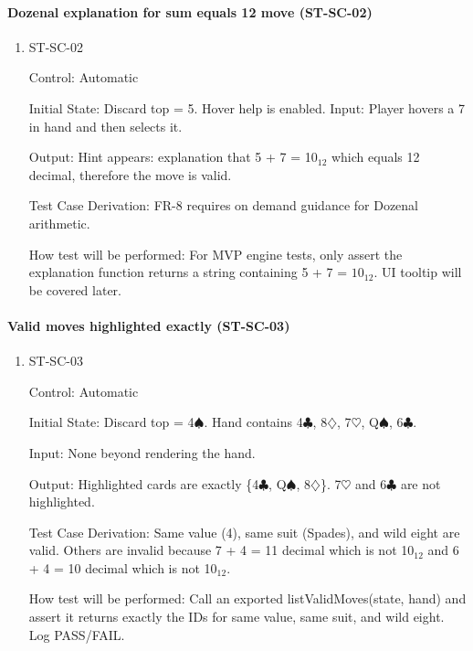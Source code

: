 \documentclass[12pt, titlepage]{article}
\begin{document}
\paragraph{Dozenal explanation for sum equals 12 move (ST-SC-02)}

\begin{enumerate}
\item{ST-SC-02\\}

Control: Automatic
					
Initial State: Discard top = 5. Hover help is enabled.					
Input: Player hovers a 7 in hand and then selects it.
					
Output: Hint appears: explanation that 5 + 7 = 10$_{12}$ which equals 12 decimal, therefore the move is valid.

Test Case Derivation: FR-8 requires on demand guidance for Dozenal arithmetic.

How test will be performed: For MVP engine tests, only assert the explanation function returns a string containing 5 + 7 = $10_{12}$. UI tooltip will be covered later.
\end{enumerate}

\paragraph{Valid moves highlighted exactly (ST-SC-03)}

\begin{enumerate}
\item{ST-SC-03\\}

Control: Automatic
					
Initial State: Discard top = 4$\spadesuit$. Hand contains 4$\clubsuit$, 8$\diamondsuit$, 7$\heartsuit$, Q$\spadesuit$, 6$\clubsuit$.
					
Input: None beyond rendering the hand.
					
Output: Highlighted cards are exactly \{4$\clubsuit$, Q$\spadesuit$, 8$\diamondsuit$\}. 7$\heartsuit$ and 6$\clubsuit$ are not highlighted.

Test Case Derivation: Same value (4), same suit (Spades), and wild eight are valid. Others are invalid because 7 + 4 = 11 decimal which is not 10$_{12}$ and 6 + 4 = 10 decimal which is not 10$_{12}$.

How test will be performed: Call an exported listValidMoves(state, hand) and assert it returns exactly the IDs for same value, same suit, and wild eight. Log PASS/FAIL.
\end{enumerate}
\end{document}
